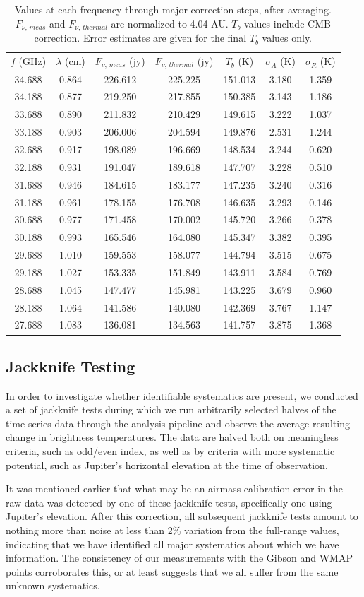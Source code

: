 \documentclass{article}
\newcommand{\tableend}{\\}
\begin{document}
	\begin{table}
	\centering
	\begin{tabular}{cc || c | c | c | c | c }
	$f$ (GHz) & $\lambda$ (cm) & $F_{\nu,\,meas}$ (jy) & $F_{\nu,\,thermal}$ (jy) & $T_b$ (K) & $\sigma_{A}$ (K) & $\sigma_{R}$ (K) \\\hhline{==#=|=|=|=|=}
	34.688 & 0.864 & 226.612 & 225.225 & 151.013 & 3.180 & 1.359 \tableend
	34.188 & 0.877 & 219.250 & 217.855 & 150.385 & 3.143 & 1.186 \tableend
	33.688 & 0.890 & 211.832 & 210.429 & 149.615 & 3.222 & 1.037 \tableend
	33.188 & 0.903 & 206.006 & 204.594 & 149.876 & 2.531 & 1.244 \tableend
	32.688 & 0.917 & 198.089 & 196.669 & 148.534 & 3.244 & 0.620 \tableend
	32.188 & 0.931 & 191.047 & 189.618 & 147.707 & 3.228 & 0.510 \tableend
	31.688 & 0.946 & 184.615 & 183.177 & 147.235 & 3.240 & 0.316 \tableend
	31.188 & 0.961 & 178.155 & 176.708 & 146.635 & 3.293 & 0.146 \tableend
	30.688 & 0.977 & 171.458 & 170.002 & 145.720 & 3.266 & 0.378 \tableend
	30.188 & 0.993 & 165.546 & 164.080 & 145.347 & 3.382 & 0.395 \tableend
	29.688 & 1.010 & 159.553 & 158.077 & 144.794 & 3.515 & 0.675 \tableend
	29.188 & 1.027 & 153.335 & 151.849 & 143.911 & 3.584 & 0.769 \tableend
	28.688 & 1.045 & 147.477 & 145.981 & 143.225 & 3.679 & 0.960 \tableend
	28.188 & 1.064 & 141.586 & 140.080 & 142.369 & 3.767 & 1.147 \tableend
	27.688 & 1.083 & 136.081 & 134.563 & 141.757 & 3.875 & 1.368 \tableend
	\end{tabular}
	\caption{\label{tab:1}Values at each frequency through major correction steps, after averaging. $F_{\nu,\,meas}$ and $F_{\nu,\,thermal}$ are normalized to 4.04 AU. $T_b$ values include CMB correction. Error estimates are given for the final $T_b$ values only.}
	\end{table}


\subsection{Jackknife Testing} \label{s:jackknife}
In order to investigate whether identifiable systematics are present, we conducted a set of jackknife tests during which we run arbitrarily selected halves of the time-series data through the analysis pipeline and observe the average resulting change in brightness temperatures.
	The data are halved both on meaningless criteria, such as odd/even index, as well as by criteria with more systematic potential, such as Jupiter's horizontal elevation at the time of observation.

	It was mentioned earlier that what may be an airmass calibration error in the raw data was detected by one of these jackknife tests, specifically one using Jupiter's elevation.
	After this correction, all subsequent jackknife tests amount to nothing more than noise at less than 2\% variation from the full-range values, indicating that we have identified all major systematics about which we have information.
	The consistency of our measurements with the Gibson and WMAP points corroborates this, or at least suggests that we all suffer from the same unknown systematics.
\end{document}
